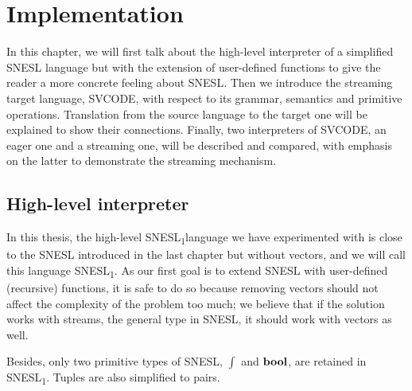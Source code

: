 
\newcommand\tr{\triangleright}
\newcommand{\proc}{\*{Proc}}
\newcommand{\bufst}{\*{BufState}}
\newcommand{\sups}{\*{Sups}}
\newcommand{\clis}{\*{Clis}}
\newcommand{\xducer}{\*{Xducer}}
\newcommand{\filling}{\texttt{Filling} \ }
\newcommand{\draining}{\texttt{Draining} \ }
\newcommand{\pin}{\texttt{Pin} \ }
\newcommand{\pout}{\texttt{Pout}}
\newcommand{\done}{\texttt{Done}}

\newcommand{\ftype}{\varphi}

\newcommand\mysnesl{SNESL\textsubscript{1}}

\def\interT#1#2#3{\vdash_{#1} #2 : #3}
\def\conc#1{#1 \ {\mathbf{concrete}}}

\chapter{Implementation}

\def\Type#1#2#3{#1 \vdash_{\Sigma} \ #2 : #3 } 
\def\Eval#1#2#3{#1 \vdash_{\Phi} #2 \Eva #3 } 

In this chapter, we will first talk about the high-level interpreter of a simplified SNESL language but with the extension of user-defined functions to give the reader a more concrete feeling about SNESL. 
Then we introduce the streaming target language, SVCODE, with respect to its grammar, semantics and primitive operations.
Translation from the source language to the target one will be explained to show their connections.
Finally, two interpreters of SVCODE, an eager one and a streaming one, will be described and compared, with emphasis on the latter to demonstrate the streaming mechanism.



\section{High-level interpreter}


In this thesis, the high-level \mysnesl language we have experimented with is close to the SNESL introduced in the last chapter but without vectors, and we will call this language \mysnesl.
As our first goal is to extend SNESL with user-defined (recursive) functions,
it is safe to do so because removing vectors should not affect the complexity of the problem too much; we believe that if the solution works with streams, the general type in SNESL, it should work with vectors as well. 

Besides, only two primitive types of SNESL, $\int$ and $\mathbf{bool}$, are retained in \mysnesl. 
Tuples are also simplified to pairs.  

